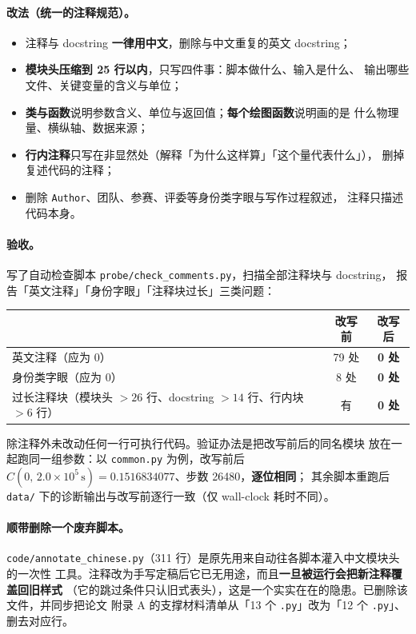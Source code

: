 \documentclass[11pt,a4paper]{ctexart}
\newcommand{\src}[1]{\texttt{#1}}
\begin{document}
\paragraph{改法（统一的注释规范）。}
\begin{itemize}[leftmargin=1.6em,itemsep=2pt]
  \item 注释与 docstring \textbf{一律用中文}，删除与中文重复的英文 docstring；
  \item \textbf{模块头压缩到 25 行以内}，只写四件事：脚本做什么、输入是什么、
  输出哪些文件、关键变量的含义与单位；
  \item \textbf{类与函数}说明参数含义、单位与返回值；\textbf{每个绘图函数}说明画的是
  什么物理量、横纵轴、数据来源；
  \item \textbf{行内注释}只写在非显然处（解释「为什么这样算」「这个量代表什么」），
  删掉复述代码的注释；
  \item 删除 \src{Author}、团队、参赛、评委等身份类字眼与写作过程叙述，
  注释只描述代码本身。
\end{itemize}

\paragraph{验收。}
写了自动检查脚本 \src{probe/check\_comments.py}，扫描全部注释块与 docstring，
报告「英文注释」「身份字眼」「注释块过长」三类问题：

\begin{center}
\small
\begin{tabular}{@{}lcc@{}}
\toprule
 & \textbf{改写前} & \textbf{改写后} \\
\midrule
英文注释（应为 0） & 79 处 & \textbf{0 处} \\
身份类字眼（应为 0） & 8 处 & \textbf{0 处} \\
过长注释块（模块头 $>26$ 行、docstring $>14$ 行、行内块 $>6$ 行） & 有 & \textbf{0 处} \\
\bottomrule
\end{tabular}
\end{center}

\noindent 除注释外未改动任何一行可执行代码。验证办法是把改写前后的同名模块
放在一起跑同一组参数：以 \src{common.py} 为例，改写前后
$C(0,\,2.0\times10^5\,\mathrm{s})=0.1516834077$、步数 26480，\textbf{逐位相同}；
其余脚本重跑后 \src{data/} 下的诊断输出与改写前逐行一致（仅 wall-clock 耗时不同）。

\paragraph{顺带删除一个废弃脚本。}
\src{code/annotate\_chinese.py}（311 行）是原先用来自动往各脚本灌入中文模块头的一次性
工具。注释改为手写定稿后它已无用途，而且\textbf{一旦被运行会把新注释覆盖回旧样式}
（它的跳过条件只认旧式表头），这是一个实实在在的隐患。已删除该文件，并同步把论文
附录 A 的支撑材料清单从「13 个 \src{.py}」改为「12 个 \src{.py}」、删去对应行。
\end{document}
